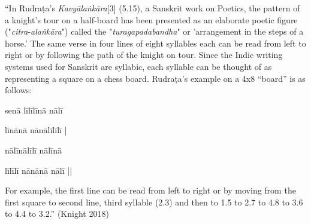 \begin{myquote}
“In Rudraṭa's \textsl{Kavyālaṅkāra}[3] (5.15), a Sanskrit work on Poetics, the pattern of a knight's tour on a half-board has been presented as an elaborate poetic figure ("\textsl{citra}-\textsl{alaṅkāra}") called the "\textsl{turagapadabandha}" or 'arrangement in the steps of a horse.' The same verse in four lines of eight syllables each can be read from left to right or by following the path of the knight on tour. Since the Indic writing systems used for Sanskrit are syllabic, each syllable can be thought of as representing a square on a chess board. Rudraṭa's example on a 4x8 “board” is as follows:

senā līlīlīnā nālī

\qquad līnānā nānālīlīlī |

\qquad nālīnālīlī nālīnā

\qquad līlīlī nānānā nālī ||
\end{myquote}

For example, the first line can be read from left to right or by moving from the first square to second line, third syllable (2.3) and then to 1.5 to 2.7 to 4.8 to 3.6 to 4.4 to 3.2.” (Knight 2018) 

